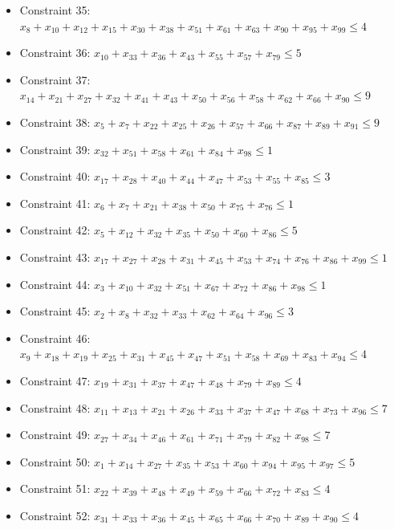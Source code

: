 \documentclass[11pt]{article}
\begin{document}
\begin{itemize}
\item Constraint 35: $x_{8} + x_{10} + x_{12} + x_{15} + x_{30} + x_{38} + x_{51} + x_{61} + x_{63} + x_{90} + x_{95} + x_{99} \le 4$
\item Constraint 36: $x_{10} + x_{33} + x_{36} + x_{43} + x_{55} + x_{57} + x_{79} \le 5$
\item Constraint 37: $x_{14} + x_{21} + x_{27} + x_{32} + x_{41} + x_{43} + x_{50} + x_{56} + x_{58} + x_{62} + x_{66} + x_{90} \le 9$
\item Constraint 38: $x_{5} + x_{7} + x_{22} + x_{25} + x_{26} + x_{57} + x_{66} + x_{87} + x_{89} + x_{91} \le 9$
\item Constraint 39: $x_{32} + x_{51} + x_{58} + x_{61} + x_{84} + x_{98} \le 1$
\item Constraint 40: $x_{17} + x_{28} + x_{40} + x_{44} + x_{47} + x_{53} + x_{55} + x_{85} \le 3$
\item Constraint 41: $x_{6} + x_{7} + x_{21} + x_{38} + x_{50} + x_{75} + x_{76} \le 1$
\item Constraint 42: $x_{5} + x_{12} + x_{32} + x_{35} + x_{50} + x_{60} + x_{86} \le 5$
\item Constraint 43: $x_{17} + x_{27} + x_{28} + x_{31} + x_{45} + x_{53} + x_{74} + x_{76} + x_{86} + x_{99} \le 1$
\item Constraint 44: $x_{3} + x_{10} + x_{32} + x_{51} + x_{67} + x_{72} + x_{86} + x_{98} \le 1$
\item Constraint 45: $x_{2} + x_{8} + x_{32} + x_{33} + x_{62} + x_{64} + x_{96} \le 3$
\item Constraint 46: $x_{9} + x_{18} + x_{19} + x_{25} + x_{31} + x_{45} + x_{47} + x_{51} + x_{58} + x_{69} + x_{83} + x_{94} \le 4$
\item Constraint 47: $x_{19} + x_{31} + x_{37} + x_{47} + x_{48} + x_{79} + x_{89} \le 4$
\item Constraint 48: $x_{11} + x_{13} + x_{21} + x_{26} + x_{33} + x_{37} + x_{47} + x_{68} + x_{73} + x_{96} \le 7$
\item Constraint 49: $x_{27} + x_{34} + x_{46} + x_{61} + x_{71} + x_{79} + x_{82} + x_{98} \le 7$
\item Constraint 50: $x_{1} + x_{14} + x_{27} + x_{35} + x_{53} + x_{60} + x_{94} + x_{95} + x_{97} \le 5$
\item Constraint 51: $x_{22} + x_{39} + x_{48} + x_{49} + x_{59} + x_{66} + x_{72} + x_{83} \le 4$
\item Constraint 52: $x_{31} + x_{33} + x_{36} + x_{45} + x_{65} + x_{66} + x_{70} + x_{89} + x_{90} \le 4$

\end{itemize}
\end{document}
